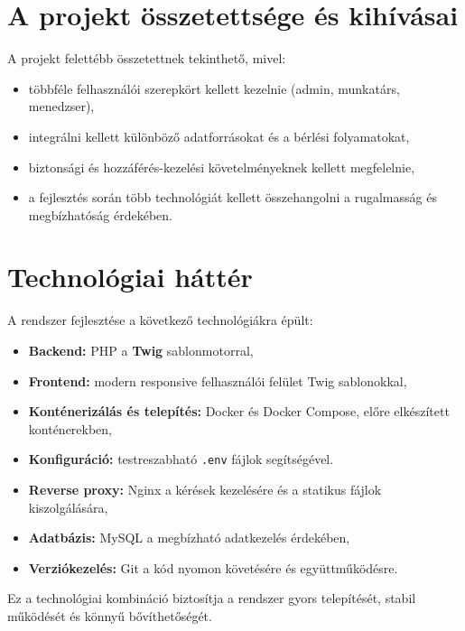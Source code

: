 \section{A projekt összetettsége és kihívásai}

A projekt felettébb összetettnek tekinthető, mivel:
\begin{itemize}
    \item többféle felhasználói szerepkört kellett kezelnie (admin, munkatárs, menedzser),
    \item integrálni kellett különböző adatforrásokat és a bérlési folyamatokat,
    \item biztonsági és hozzáférés-kezelési követelményeknek kellett megfelelnie,
    \item a fejlesztés során több technológiát kellett összehangolni a rugalmasság és megbízhatóság érdekében.
\end{itemize}

\section{Technológiai háttér}

A rendszer fejlesztése a következő technológiákra épült:
\begin{itemize}
    \item \textbf{Backend:} PHP a \textbf{Twig} sablonmotorral,
    \item \textbf{Frontend:} modern responsive felhasználói felület Twig sablonokkal,
    \item \textbf{Konténerizálás és telepítés:} Docker és Docker Compose, előre elkészített konténerekben,
    \item \textbf{Konfiguráció:} testreszabható \texttt{.env} fájlok segítségével.
    \item \textbf{Reverse proxy:} Nginx a kérések kezelésére és a statikus fájlok kiszolgálására,
    \item \textbf{Adatbázis:} MySQL a megbízható adatkezelés érdekében,
    \item \textbf{Verziókezelés:} Git a kód nyomon követésére és együttműködésre.
\end{itemize}

Ez a technológiai kombináció biztosítja a rendszer gyors telepítését, stabil működését és könnyű bővíthetőségét.